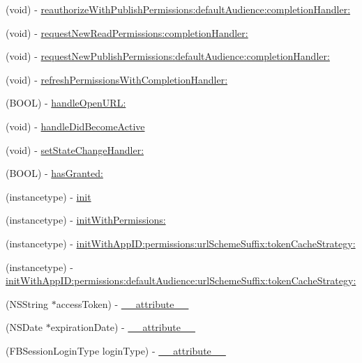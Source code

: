 \begin{DoxyCompactItemize}
\item 
(void) -\/ \hyperlink{interfaceFBSession_af0b2652e875c4996166b1c7ce3d12b73}{reauthorize\+With\+Publish\+Permissions\+:default\+Audience\+:completion\+Handler\+:}
\item 
(void) -\/ \hyperlink{interfaceFBSession_a14cf87331489399e4317bda2c718d3a3}{request\+New\+Read\+Permissions\+:completion\+Handler\+:}
\item 
(void) -\/ \hyperlink{interfaceFBSession_a86dd849f0bd1f667e6107a13deb4607d}{request\+New\+Publish\+Permissions\+:default\+Audience\+:completion\+Handler\+:}
\item 
(void) -\/ \hyperlink{interfaceFBSession_a569f5daa686e4593bd0d5e68016a15a0}{refresh\+Permissions\+With\+Completion\+Handler\+:}
\item 
(B\+O\+OL) -\/ \hyperlink{interfaceFBSession_a99548fc3fd7dc7f5b8dc24019be88000}{handle\+Open\+U\+R\+L\+:}
\item 
(void) -\/ \hyperlink{interfaceFBSession_a647536f4770fc746b6865ad610779767}{handle\+Did\+Become\+Active}
\item 
(void) -\/ \hyperlink{interfaceFBSession_a56e9467165f832f3151dadd14190868b}{set\+State\+Change\+Handler\+:}
\item 
(B\+O\+OL) -\/ \hyperlink{interfaceFBSession_aa74d6239fcde1f9d6dd9530538eb691b}{has\+Granted\+:}
\item 
(instancetype) -\/ \hyperlink{interfaceFBSession_ac5ec026f515c232cd4498cf2bc4022b4}{init}
\item 
(instancetype) -\/ \hyperlink{interfaceFBSession_a3f8419d590fb8f950aa9aee7110fb5e6}{init\+With\+Permissions\+:}
\item 
(instancetype) -\/ \hyperlink{interfaceFBSession_ae73ce3214852d1af28cbb02e7f733b37}{init\+With\+App\+I\+D\+:permissions\+:url\+Scheme\+Suffix\+:token\+Cache\+Strategy\+:}
\item 
(instancetype) -\/ \hyperlink{interfaceFBSession_a7f878c2e85b4f400378bf0c00314e7c3}{init\+With\+App\+I\+D\+:permissions\+:default\+Audience\+:url\+Scheme\+Suffix\+:token\+Cache\+Strategy\+:}
\item 
(N\+S\+String $\ast$access\+Token) -\/ \hyperlink{interfaceFBSession_a129a9e2b497ba201043bb82244156341}{\+\_\+\+\_\+attribute\+\_\+\+\_\+}
\item 
(N\+S\+Date $\ast$expiration\+Date) -\/ \hyperlink{interfaceFBSession_a42e6a02db4caa8197e8fc851bc18f1e1}{\+\_\+\+\_\+attribute\+\_\+\+\_\+}
\item 
(F\+B\+Session\+Login\+Type login\+Type) -\/ \hyperlink{interfaceFBSession_acd3c247502e2514d93ccf123ad4824f8}{\+\_\+\+\_\+attribute\+\_\+\+\_\+}

\end{DoxyCompactItemize}
